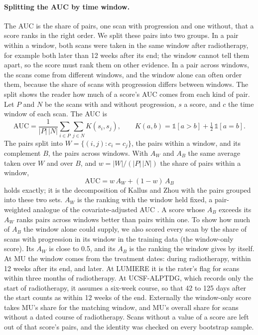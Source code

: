 \paragraph*{Splitting the AUC by time window.} The AUC is the share of pairs, one scan with progression and one
without, that a score ranks in the right order. We split these pairs into two groups. In a pair within a window, both
scans were taken in the same window after radiotherapy, for example both later than 12 weeks after its end; the window
cannot tell them apart, so the score must rank them on other evidence. In a pair across windows, the scans come from
different windows, and the window alone can often order them, because the share of scans with progression differs
between windows. The split shows the reader how much of a score's AUC comes from each kind of pair. Let $P$ and $N$ be
the scans with and without progression, $s$ a score, and $c$ the time window of each scan. The AUC is
\begin{equation}
\mathrm{AUC} = \frac{1}{|P|\,|N|} \sum_{i \in P} \sum_{j \in N} K(s_i, s_j), \qquad
K(a, b) = \mathbb{1}[a > b] + \tfrac12\, \mathbb{1}[a = b].
\end{equation}
The pairs split into $W = \{(i, j) : c_i = c_j\}$, the pairs within a window, and its complement $B$, the pairs across
windows. With $A_W$ and $A_B$ the same average taken over $W$ and over $B$, and $w = |W| / (|P|\,|N|)$ the share of
pairs within a window,
\begin{equation}
\mathrm{AUC} = w\, A_W + (1 - w)\, A_B
\end{equation}
holds exactly; it is the decomposition of Kallus and Zhou \citep{kallus2019} with the pairs grouped into these two
sets. $A_W$ is the ranking with the window held fixed, a pair-weighted analogue of the covariate-adjusted AUC
\citep{janes2008,janes2009}. A score whose $A_B$ exceeds its $A_W$ ranks pairs across windows better than pairs within
one. To show how much of $A_B$ the window alone could supply, we also scored every scan by the share of scans with
progression in its window in the training data (the window-only score). Its $A_W$ is close to 0.5, and its $A_B$ is
the ranking the window gives by itself. At MU the window comes from the treatment dates: during radiotherapy, within 12
weeks after its end, and later. At LUMIERE it is the rater's flag for scans within three months of radiotherapy. At
UCSF-ALPTDG, which records only the start of radiotherapy, it assumes a six-week course, so that 42 to 125 days after
the start counts as within 12 weeks of the end. Externally the window-only score takes MU's share for the matching
window, and MU's overall share for scans without a dated course of radiotherapy. Scans without a value of a score are
left out of that score's pairs, and the identity was checked on every bootstrap sample.
